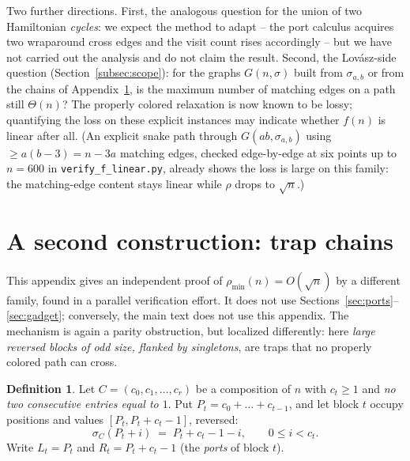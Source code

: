 \documentclass[11pt]{article}
\theoremstyle{definition}
\newtheorem{definition}[theorem]{Definition}
\newcommand{\pmin}{\rho_{\min}}
\begin{document}
Two further directions. First, the analogous question for the union of two Hamiltonian
\emph{cycles}: we expect the method to adapt -- the port calculus acquires two
wraparound cross edges and the visit count rises accordingly -- but we have not carried
out the analysis and do not claim the result. Second, the Lov\'asz-side question
(Section~\ref{subsec:scope}): for the graphs $G(n, \sigma)$ built from $\sigma_{a,b}$ or
from the chains of Appendix~\ref{app:trap}, is the maximum number of matching edges on a
path still $\Theta(n)$? The properly colored relaxation is now known to be lossy;
quantifying the loss on these explicit instances may indicate whether $f(n)$ is linear
after all. (An explicit snake path through $G(ab,\sigma_{a,b})$ using $\ge a(b-3) = n -
3a$ matching edges, checked edge-by-edge at six points up to $n=600$ in
\texttt{verify\_f\_linear.py}, already shows the loss is large on this family: the
matching-edge content stays linear while $\rho$ drops to $\sqrt n$.)

\appendix

\section{A second construction: trap chains}\label{app:trap}

This appendix gives an independent proof of $\pmin(n) = O(\sqrt n)$ by a different
family, found in a parallel verification effort. It does not use
Sections~\ref{sec:ports}--\ref{sec:gadget}; conversely, the main text does not use this
appendix. The mechanism is again a parity obstruction, but localized differently: here
\emph{large reversed blocks of odd size, flanked by singletons}, are traps that no
properly colored path can cross.

\begin{definition}\label{def:chain}
Let $C = (c_0, c_1, \dots, c_r)$ be a composition of $n$ with $c_t \ge 1$ and
\emph{no two consecutive entries equal to $1$}. Put $P_t = c_0 + \dots + c_{t-1}$, and
let block $t$ occupy positions and values $[P_t, P_t + c_t - 1]$, reversed:
\[
\sigma_C(P_t + i) \;=\; P_t + c_t - 1 - i, \qquad 0 \le i < c_t .
\]
Write $L_t = P_t$ and $R_t = P_t + c_t - 1$ (the \emph{ports} of block $t$).
\end{definition}
\end{document}
